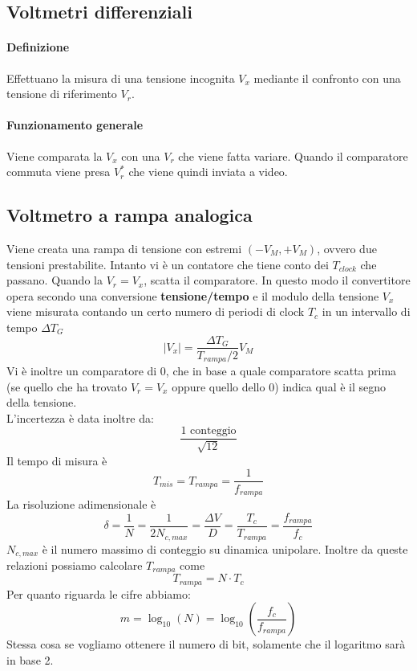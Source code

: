 \documentclass{article}
\begin{document}
	\subsection*{Voltmetri differenziali}
	\paragraph*{Definizione}
	Effettuano la misura di una tensione incognita \textbf{$V_x$} mediante il confronto con una tensione di riferimento \textbf{$V_r$}.\\
	\paragraph*{Funzionamento generale}
	Viene comparata la $V_x$ con una $V_r$ che viene fatta variare. Quando il comparatore commuta viene presa $V^*_r$ che viene quindi inviata a video.
	\subsection*{Voltmetro a rampa analogica}
	Viene creata una rampa di tensione con estremi $(-V_M, +V_M)$, ovvero due tensioni prestabilite. Intanto vi è un contatore che tiene conto dei $T_{clock}$ che passano. Quando la $V_r = V_x$, scatta il comparatore. In questo modo il convertitore opera secondo una conversione \textbf{tensione/tempo} e il modulo della tensione $V_x$ viene misurata contando un certo numero di periodi di clock $T_c$ in un intervallo di tempo $\Delta T_G$
	\begin{equation}
		|V_x|= \dfrac{\Delta T_G}{T_{rampa}/2}V_M
	\end{equation}
	Vi è inoltre un comparatore di 0, che in base a quale comparatore scatta prima (se quello che ha trovato $V_r = V_x$ oppure quello dello 0) indica qual è il segno della tensione.\\
	L'incertezza è data inoltre da:
	\begin{equation}
		\dfrac{\text{1 conteggio}}{\sqrt{12}}
	\end{equation}
	Il tempo di misura è
	\begin{equation}
		T_{mis} = T_{rampa} = \frac{1}{f_{rampa}}
	\end{equation}
	La risoluzione adimensionale è
	\begin{equation}
		\delta = \frac{1}{N} = \frac{1}{2N_{c,max}} = \frac{\Delta V}{D} = \frac{T_c}{T_{rampa}} = \frac{f_{rampa}}{f_c}
	\end{equation}
	$N_{c,max}$ è il numero massimo di conteggio su dinamica unipolare. Inoltre da queste relazioni possiamo calcolare $T_{rampa}$ come
	\begin{equation}
		T_{rampa} = N \cdot T_c
	\end{equation}
	Per quanto riguarda le cifre abbiamo:
	\begin{equation}
		m = \log_{10}(N) = \log_{10}\left( \frac{f_c}{f_{rampa}} \right)
	\end{equation}
	Stessa cosa se vogliamo ottenere il numero di bit, solamente che il logaritmo sarà in base 2.
\end{document}
